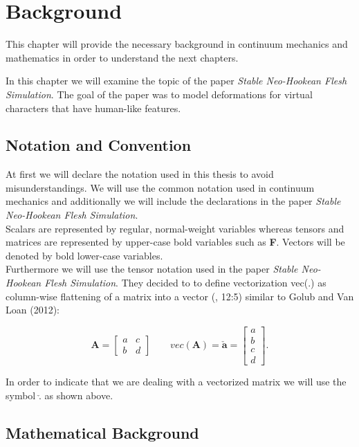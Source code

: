 \chapter{Background} \label{c:Background}
This chapter will provide the necessary background in continuum mechanics and mathematics in order to understand the next chapters.

In this chapter we will examine the topic of the paper \textit{Stable Neo-Hookean Flesh Simulation}. The goal of the paper was to model deformations for virtual characters that have human-like features.


\section{Notation and Convention}
At first we will declare the notation used in this thesis to avoid misunderstandings. We will use the common notation used in continuum mechanics and additionally we will include the declarations in the paper \textit{Stable Neo-Hookean Flesh Simulation}. 
\\
Scalars are represented by regular, normal-weight variables whereas 
tensors and matrices are represented by upper-case bold variables such as \textbf{F}. Vectors will be denoted by bold lower-case variables.
\\
Furthermore we will use the tensor notation used in the paper \textit{Stable Neo-Hookean Flesh Simulation}. They decided to to define vectorization vec(.) as column-wise flattening of a matrix into a vector (\cite{Smith:2018:SNF:3191713.3180491}, 12:5) similar to Golub and Van Loan (2012):

\[
\textbf{A} = \begin{bmatrix} a & c \\ b & d \end{bmatrix} \qquad vec(\textbf{A}) = \boldsymbol{\check{a}} = \begin{bmatrix} a \\ b \\ c \\ d \end{bmatrix}.
\]

In order to indicate that we are dealing with a vectorized matrix we will use the symbol $\check{.}$ as shown above.


\section{Mathematical Background}

